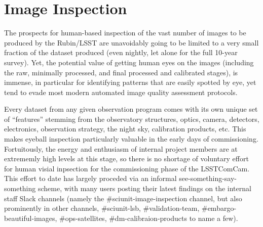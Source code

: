 \section{Image Inspection}
\label{sec:image_inspection}

The prospects for human-based inspection of the vast number of images to be
produced by the Rubin/LSST are unavoidably going to be limited to a very small
fraction of the dataset produced (even nightly, let alone for the full 10-year
survey).  Yet, the potential value of getting human eyes on the images (including
the raw, minimally processed, and final processed and calibrated stages), is
immense, in particular for identifying patterns that are easily spotted by eye,
yet tend to evade most modern automated image quality assessment protocols.

Every dataset from any given observation program comes with its own unique set
of ``features'' stemming from the observatory structures, optics, camera,
detectors, electronics, observation strategy, the night sky, calibration products, etc.  This makes
eyeball inspection particularly valuable in the early days of commissioning.
Fortuitously, the energy and enthusiasm of internal project members
are at extrememly high levels at this stage, so there is no shortage of voluntary
effort for human visial inpsection for the commissioning phase of the LSSTComCam.
This effort to date has largely proceded via an informal
see-something-say-something scheme, with many users posting their latest findings
on the internal staff Slack channels (namely the \#sciunit-image-inspection channel,
but also prominently in other channels, \#sciunit-lsb, \#validation-team,
\#embargo-beautiful-images, \#ops-satellites, \#dm-calibraion-products to name a few).

